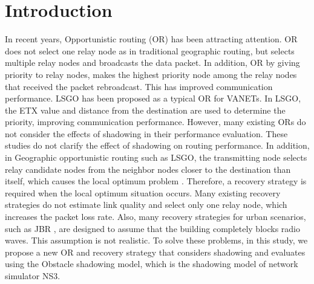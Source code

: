 \documentclass{comex}
\begin{document}







\section{Introduction}


In recent years, Opportunistic routing (OR) \cite{opportunistic} has been attracting attention. OR does not select one relay node as in traditional geographic routing\cite{geographic}, but selects multiple relay nodes and broadcasts the data packet. 
In addition, OR by giving priority to relay nodes, makes the highest priority node among the relay nodes that received the packet rebroadcast.
This has improved communication performance. LSGO\cite{LSGO} has been proposed as a typical OR for VANETs.  
In LSGO, the ETX value and distance from the destination are used to determine the priority, improving communication performance. 
However, many existing ORs do not consider the effects of shadowing in their performance evaluation.
These studies do not clarify the effect of shadowing on routing performance.
In addition, in Geographic opportunistic routing such as LSGO, the transmitting node selects relay candidate nodes from the neighbor nodes  closer to the destination than itself, which causes the local optimum problem \cite{geographic}. 
Therefore, a recovery strategy is required when the local optimum situation occurs. 
Many existing recovery strategies do not estimate link quality and select only one relay node, which increases the packet loss rate. 
Also, many recovery strategies for urban scenarios, such as JBR \cite{JBR}, are designed to assume that the building completely blocks radio waves.
This assumption is not realistic. To solve these problems, in this study, we propose a new OR and recovery strategy that considers shadowing and evaluates using the Obstacle shadowing model\cite{obstacle}, which is the shadowing model of network simulator NS3.
\end{document}
